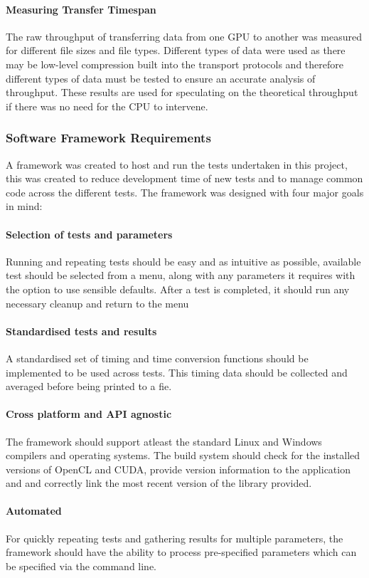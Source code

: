 \documentclass[12pt,a4paper]{article}
\begin{document}
\paragraph{Measuring Transfer Timespan}
The raw throughput of transferring data from one GPU to another was measured for different file sizes and file types. Different types of data were used as there may be low-level compression built into the transport protocols and therefore different types of data must be tested to ensure an accurate analysis of throughput. These results are used for speculating on the theoretical throughput if there was no need for the CPU to intervene.
\subsubsection{Software Framework Requirements}
A framework was created to host and run the tests undertaken in this project, this was created to reduce development time of new tests and to manage common code across the different tests. The framework was designed with four major goals in mind:

\paragraph{Selection of tests and parameters}
Running and repeating tests should be easy and as intuitive as possible, available test should be selected from a menu, along with any parameters it requires with the option to use sensible defaults. After a test is completed, it should run any necessary cleanup and return to the menu
\paragraph{Standardised tests and results}
A standardised set of timing and time conversion functions should be  implemented to be used across tests. This timing data should be collected and averaged before being printed to a fie.
\paragraph{Cross platform and API agnostic}
The framework should support atleast the standard Linux and Windows compilers and operating systems.  The build system should check for the installed versions of OpenCL and CUDA, provide version information to the application and and correctly link the most recent version of the library provided.
\paragraph{Automated}
For quickly repeating tests and gathering results for multiple parameters, the framework should have the ability to process pre-specified parameters which can be specified via the command line.
\end{document}
